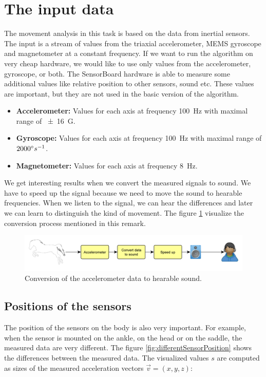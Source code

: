 \section{The input data}
The movement analysis in this task is based on the data from inertial sensors. The input is a stream of values from the triaxial accelerometer, \ac{MEMS} gyroscope and magnetometer at a constant frequency. If we want to run the algorithm on very cheap hardware, we would like to use only values from the accelerometer, gyroscope, or both. The SensorBoard hardware is able to measure some additional values like relative position to other sensors, sound etc. These values are important, but they are not used in the basic version of the algorithm.

\begin{itemize}
    \item \textbf{Accelerometer:} Values for each axis at frequency \SI{100}{Hz} with maximal range of \SI{\pm 16}{G}.
    \item \textbf{Gyroscope:} Values for each axis at frequency \SI{100}{Hz} with maximal range of $2000 \degree s^{-1}$.
    \item \textbf{Magnetometer:} Values for each axis at frequency \SI{8}{Hz}.
\end{itemize}

\begin{remark}
    We get interesting results when we convert the measured signals to sound. We have to speed up the signal because we need to move the sound to hearable frequencies. When we listen to the signal, we can hear the differences and later we can learn to distinguish the kind of movement. The figure \ref{accToSound} visualize the conversion process mentioned in this remark.
    
    \begin{figure}
        \centering
        \label{accToSound}
        \caption{Conversion of the accelerometer data to hearable sound.}
        \includegraphics[width=\linewidth]{img/accToSound.pdf}
    \end{figure}
\end{remark}

\subsection{Positions of the sensors}
The position of the sensors on the body is also very important. For example, when the sensor is mounted on the ankle, on the head or on the saddle, the measured data are very different. The figure \ref{fig:differentSensorPosition} shows the differences between the measured data. The visualized values $s$ are computed as sizes of the measured acceleration vectors $\vec{v} = (x,y,z)$:


